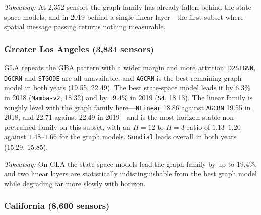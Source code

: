 \begin{insightbox}
\textit{Takeaway:} At 2,352 sensors the graph family has already fallen behind
the state-space models, and in 2019 behind a single linear layer---the first
subset where spatial message passing returns nothing measurable.
\end{insightbox}

\subsubsection{Greater Los Angeles (3,834 sensors)}
\label{app:extended:gla}

GLA repeats the GBA pattern with a wider margin and more attrition:
\texttt{D2STGNN}, \texttt{DGCRN} and \texttt{STGODE} are all unavailable, and
\texttt{AGCRN} is the best remaining graph model in both years (19.55, 22.49).
The best state-space model leads it by $6.3\%$ in 2018 (\texttt{Mamba-v2},
18.32) and by $19.4\%$ in 2019 (\texttt{S4}, 18.13). The linear family is
roughly level with the graph family here---\texttt{NLinear} 18.86 against
\texttt{AGCRN} 19.55 in 2018, and 22.71 against 22.49 in 2019---and is the most
horizon-stable non-pretrained family on this subset, with an $H{=}12$ to
$H{=}3$ ratio of $1.13$--$1.20$ against $1.48$--$1.66$ for the graph models.
\texttt{Sundial} leads overall in both years (15.29, 15.85).

\begin{insightbox}
\textit{Takeaway:} On GLA the state-space models lead the graph family by up to
$19.4\%$, and two linear layers are statistically indistinguishable from the
best graph model while degrading far more slowly with horizon.
\end{insightbox}

\subsubsection{California (8,600 sensors)}
\label{app:extended:ca}

